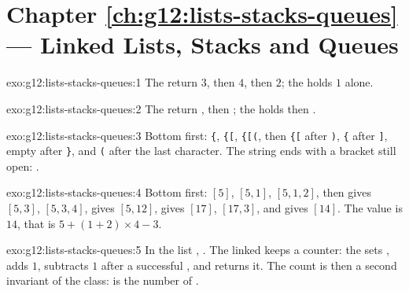 \section*{Chapter \ref{ch:g12:lists-stacks-queues} --- Linked Lists, Stacks and Queues}

\begin{solution}{exo:g12:lists-stacks-queues:1}
The  return $3$, then $4$, then $2$; the  holds $1$ alone.
\end{solution}

\begin{solution}{exo:g12:lists-stacks-queues:2}
The  return , then ; the  holds  then .
\end{solution}

\begin{solution}{exo:g12:lists-stacks-queues:3}
Bottom first: \texttt{\{}, \texttt{\{[}, \texttt{\{[(}, then \texttt{\{[} after \texttt{)}, \texttt{\{} after
\texttt{]}, empty after \texttt{\}}, and \texttt{(} after the last character. The string ends with a bracket still open: .
\end{solution}

\begin{solution}{exo:g12:lists-stacks-queues:4}
Bottom first: $[5]$, $[5, 1]$, $[5, 1, 2]$, then \code{+} gives $[5, 3]$, $[5, 3, 4]$, \code{*} gives $[5, 12]$,
\code{+} gives $[17]$, $[17, 3]$, and \code{-} gives $[14]$. The value is $14$, that is $5 + (1 + 2) \times 4 - 3$.
\end{solution}

\begin{solution}{exo:g12:lists-stacks-queues:5}
In the list , . The linked  keeps a counter: the  sets
,  adds $1$,  subtracts $1$ after a successful , and  returns
it. The count is then a second invariant of the class:  is the number of .
\end{solution}

